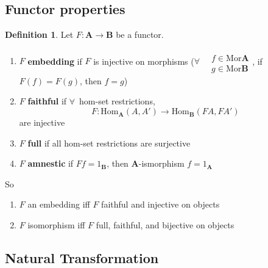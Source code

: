 \documentclass[twoside,landscape,10pt]{amsart}
\theoremstyle{plain}
\theoremstyle{definition}
\newtheorem{definition}{Definition}
\theoremstyle{remark}
\begin{document}
\begin{multicols*}{2}
\begin{itemize}


\end{itemize}

\subsection{Functor properties}

\begin{definition}
  Let $F: \mathbf{A} \to \mathbf{B}$ be a functor.  

\begin{enumerate}
  \item $F$ \textbf{embedding } if $F$ is injective on morphisms ($\forall \, \begin{aligned} & \quad \\
    & f \in \text{Mor}\mathbf{A} \\
    & g \in \text{Mor}\mathbf{B} \end{aligned}$, if $F(f) = F(g)$, then $f=g$) 
\item $F$ \textbf{faithful } if $\forall \,$ hom-set restrictions, 
\[
F: \text{Hom}_{\mathbf{A}}(A,A') \to \text{Hom}_{\mathbf{B}}(FA,FA')
\]
are injective
\item $F$ \textbf{full} if all hom-set restrictions are surjective 
\item $F$ \textbf{amnestic} if $Ff=1_{\mathbf{B}}$, then $\mathbf{A}$-ismorphism $f=1_{\mathbf{A}}$
\end{enumerate}
So
\begin{enumerate}
\item $F$ an embedding iff $F$ faithful and injective on objects
\item $F$ isomorphism iff $F$ full, faithful, and bijective on objects
\end{enumerate}

\end{definition}




\subsection{Natural Transformation}


\end{multicols*}
\end{document}
